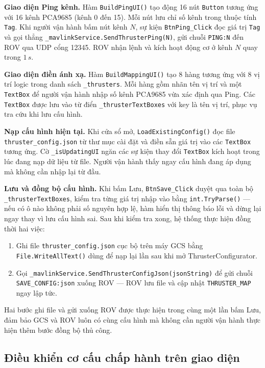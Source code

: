 \documentclass[../DoAn.tex]{subfiles}
\begin{document}
\textbf{Giao diện Ping kênh.}
Hàm \texttt{BuildPingUI()} tạo động 16 nút \texttt{Button} tương ứng
với 16 kênh PCA9685 (kênh 0 đến 15). Mỗi nút lưu chỉ số kênh trong
thuộc tính \texttt{Tag}. Khi người vận hành bấm nút kênh $N$, sự kiện
\texttt{BtnPing\_Click} đọc giá trị \texttt{Tag} và gọi thẳng
\texttt{\_mavlinkService.SendThrusterPing(N)}, gửi chuỗi
\texttt{PING:N} đến ROV qua UDP cổng 12345. ROV nhận lệnh và kích
hoạt động cơ ở kênh $N$ quay trong $1\,s$.

\textbf{Giao diện điền ánh xạ.}
Hàm \texttt{BuildMappingUI()} tạo 8 hàng tương ứng với 8 vị trí logic
trong danh sách \texttt{\_thrusters}. Mỗi hàng gồm nhãn tên vị trí
và một \texttt{TextBox} để người vận hành nhập số kênh PCA9685 vừa
xác định qua Ping. Các \texttt{TextBox} được lưu vào từ điển
\texttt{\_thrusterTextBoxes} với key là tên vị trí, phục vụ tra cứu
khi lưu cấu hình.

\textbf{Nạp cấu hình hiện tại.}
Khi cửa sổ mở, \texttt{LoadExistingConfig()} đọc file
\texttt{thruster\_config.json} từ thư mục cài đặt và điền sẵn giá
trị vào các \texttt{TextBox} tương ứng. Cờ \texttt{\_isUpdatingUI}
ngăn các sự kiện thay đổi \texttt{TextBox} kích hoạt trong lúc đang
nạp dữ liệu từ file. Người vận hành thấy ngay cấu hình đang áp dụng
mà không cần nhập lại từ đầu.

\textbf{Lưu và đồng bộ cấu hình.}
Khi bấm Lưu, \texttt{BtnSave\_Click} duyệt qua toàn bộ
\texttt{\_thrusterTextBoxes}, kiểm tra từng giá trị nhập vào bằng
\texttt{int.TryParse()} --- nếu có ô nào không phải số nguyên hợp lệ,
hàm hiển thị thông báo lỗi và dừng lại ngay thay vì lưu cấu hình
sai. Sau khi kiểm tra xong, hệ thống thực hiện đồng thời hai việc:

\begin{enumerate}
    \item Ghi file \texttt{thruster\_config.json} cục bộ trên máy GCS
    bằng \texttt{File.WriteAllText()} dùng để nạp lại lần sau khi
    mở ThrusterConfigurator.
    \item Gọi \texttt{\_mavlinkService.SendThrusterConfigJson(jsonString)}
    để gửi chuỗi \texttt{SAVE\_CONFIG:json} xuống ROV --- ROV lưu file
    và cập nhật \texttt{THRUSTER\_MAP} ngay lập tức.
\end{enumerate}

Hai bước ghi file và gửi xuống ROV được thực hiện trong cùng một lần
bấm Lưu, đảm bảo GCS và ROV luôn có cùng cấu hình mà không cần người
vận hành thực hiện thêm bước đồng bộ thủ công.
\subsection{Điều khiển cơ cấu chấp hành trên giao diện}
\end{document}
